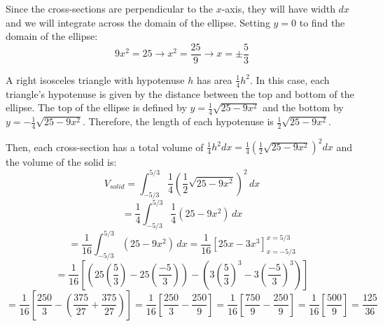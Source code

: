 \begin{Answer}[ref = volume6]
Since the cross-sections are perpendicular to the $x$-axis, they will have 
width $dx$ and we will integrate across the domain of the ellipse. Setting $y =
0$ to find the domain of the ellipse:
$$9x^2 = 25 \to x^2 = \frac{25}{9} \to x = \pm \frac{5}{3}$$

A right isosceles triangle with hypotenuse $h$ has area $\frac{1}{4}h^2$. In 
this case, each triangle's hypotenuse is given by the distance between the top 
and bottom of the ellipse. The top of the ellipse is defined by $y = \frac{1}{4
} \sqrt{25 - 9x^2}$ and the bottom by $y = -\frac{1}{4} \sqrt{25 - 9x^2}$. 
Therefore, the length of each hypotenuse is $\frac{1}{2}\sqrt{25-9x^2}$. 

Then, each cross-section has a total volume of $\frac{1}{4}h^2 dx = \frac{1}{4}
\left( \frac{1}{2} \sqrt{25 - 9x^2} \right)^2 dx$ and the volume of the solid 
is:
$$V_{solid} = \int_{-5/3}^{5/3} \frac{1}{4} \left( \frac{1}{2} \sqrt{25 - 9x^2}
\right)^2 \, dx$$
$$= \frac{1}{4} \int_{-5/3}^{5/3} \frac{1}{4} \left( 25 - 9x^2 \right) \, dx$$
$$= \frac{1}{16} \int_{-5/3}^{5/3} \left( 25 - 9x^2 \right) \, dx = \frac{1}{16}
\left[ 25x - 3x^3 \right]_{x = -5/3}^{x = 5/3}$$
$$= \frac{1}{16} \left[ \left( 25 \left( \frac{5}{3} \right) - 25 \left( \frac{
-5}{3} \right) \right) - \left( 3 \left( \frac{5}{3} \right)^3 - 3 \left( 
\frac{-5}{3} \right)^3 \right) \right]$$
$$= \frac{1}{16} \left[ \frac{250}{3} - \left( \frac{375}{27} + \frac{375}{27} 
\right) \right] = \frac{1}{16} \left[ \frac{250}{3} - \frac{250}{9}\right] = 
\frac{1}{16} \left[  \frac{750}{9} - \frac{250}{9} \right] = \frac{1}{16} 
\left[ \frac{500}{9} \right] = \frac{125}{36}$$
\end{Answer}
